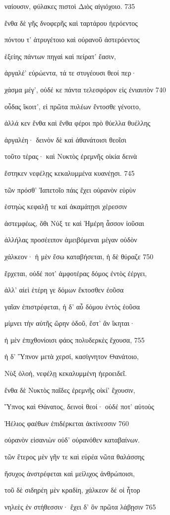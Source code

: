 ναίουσιν, φύλακες πιστοὶ Διὸς αἰγιόχοιο. 735

ἔνθα δὲ γῆς δνοφερῆς καὶ ταρτάρου ἠερόεντος 

πόντου τ' ἀτρυγέτοιο καὶ οὐρανοῦ ἀστερόεντος

ἑξείης πάντων πηγαὶ καὶ πείρατ' ἔασιν,

ἀργαλέ' εὐρώεντα, τά τε στυγέουσι θεοί περ·

χάσμα μέγ', οὐδέ κε πάντα τελεσφόρον εἰς ἐνιαυτὸν 740

οὖδας ἵκοιτ', εἰ πρῶτα πυλέων ἔντοσθε γένοιτο,

ἀλλά κεν ἔνθα καὶ ἔνθα φέροι πρὸ θύελλα θυέλλης 

ἀργαλέη· δεινὸν δὲ καὶ ἀθανάτοισι θεοῖσι 

τοῦτο τέρας· καὶ Νυκτὸς ἐρεμνῆς οἰκία δεινὰ

ἕστηκεν νεφέλῃς κεκαλυμμένα κυανέῃσι. 745 

τῶν πρόσθ' Ἰαπετοῖο πάις ἔχει οὐρανὸν εὐρὺν

ἑστηὼς κεφαλῇ τε καὶ ἀκαμάτῃσι χέρεσσιν

ἀστεμφέως, ὅθι Νύξ τε καὶ Ἡμέρη ἆσσον ἰοῦσαι

ἀλλήλας προσέειπον ἀμειβόμεναι μέγαν οὐδὸν 

χάλκεον· ἡ μὲν ἔσω καταβήσεται, ἡ δὲ θύραζε 750 

ἔρχεται, οὐδέ ποτ' ἀμφοτέρας δόμος ἐντὸς ἐέργει,

ἀλλ' αἰεὶ ἑτέρη γε δόμων ἔκτοσθεν ἐοῦσα

γαῖαν ἐπιστρέφεται, ἡ δ' αὖ δόμου ἐντὸς ἐοῦσα 

μίμνει τὴν αὐτῆς ὥρην ὁδοῦ, ἔστ' ἂν ἵκηται· 

ἡ μὲν ἐπιχθονίοισι φάος πολυδερκὲς ἔχουσα, 755 

ἡ δ' Ὕπνον μετὰ χερσί, κασίγνητον Θανάτοιο, 

Νὺξ ὀλοή, νεφέλῃ κεκαλυμμένη ἠεροειδεῖ.

ἔνθα δὲ Νυκτὸς παῖδες ἐρεμνῆς οἰκί' ἔχουσιν,

Ὕπνος καὶ Θάνατος, δεινοὶ θεοί· οὐδέ ποτ' αὐτοὺς 

Ἠέλιος φαέθων ἐπιδέρκεται ἀκτίνεσσιν 760

οὐρανὸν εἰσανιὼν οὐδ' οὐρανόθεν καταβαίνων. 

τῶν ἕτερος μὲν γῆν τε καὶ εὐρέα νῶτα θαλάσσης 

ἥσυχος ἀνστρέφεται καὶ μείλιχος ἀνθρώποισι,

τοῦ δὲ σιδηρέη μὲν κραδίη, χάλκεον δέ οἱ ἦτορ

νηλεὲς ἐν στήθεσσιν· ἔχει δ' ὃν πρῶτα λάβῃσιν 765 

